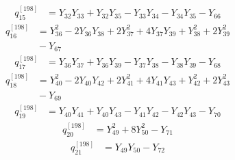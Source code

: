 \begin{equation}\label{q198:row:015}
\begin{aligned}
q_{15}^{[198]} &={} Y_{32}Y_{33} + Y_{32}Y_{35} - Y_{33}Y_{34} - Y_{34}Y_{35} - Y_{66}
\end{aligned}
\end{equation}
\begin{equation}\label{q198:row:016}
\begin{aligned}
q_{16}^{[198]} &={} Y_{36}^{2} - 2Y_{36}Y_{38} + 2Y_{37}^{2} + 4Y_{37}Y_{39} + Y_{38}^{2} + 2Y_{39}^{2}\\
&{} - Y_{67}
\end{aligned}
\end{equation}
\begin{equation}\label{q198:row:017}
\begin{aligned}
q_{17}^{[198]} &={} Y_{36}Y_{37} + Y_{36}Y_{39} - Y_{37}Y_{38} - Y_{38}Y_{39} - Y_{68}
\end{aligned}
\end{equation}
\begin{equation}\label{q198:row:018}
\begin{aligned}
q_{18}^{[198]} &={} Y_{40}^{2} - 2Y_{40}Y_{42} + 2Y_{41}^{2} + 4Y_{41}Y_{43} + Y_{42}^{2} + 2Y_{43}^{2}\\
&{} - Y_{69}
\end{aligned}
\end{equation}
\begin{equation}\label{q198:row:019}
\begin{aligned}
q_{19}^{[198]} &={} Y_{40}Y_{41} + Y_{40}Y_{43} - Y_{41}Y_{42} - Y_{42}Y_{43} - Y_{70}
\end{aligned}
\end{equation}
\begin{equation}\label{q198:row:020}
\begin{aligned}
q_{20}^{[198]} &={} Y_{49}^{2} + 8Y_{50}^{2} - Y_{71}
\end{aligned}
\end{equation}
\begin{equation}\label{q198:row:021}
\begin{aligned}
q_{21}^{[198]} &={} Y_{49}Y_{50} - Y_{72}
\end{aligned}
\end{equation}
